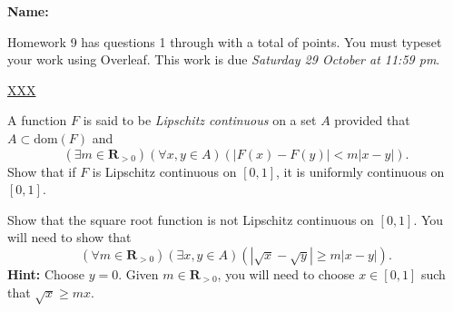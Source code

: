 \documentclass[12pt,fleqn]{exam}
\newcommand{\reals}{\mathbf{R}}
\newcommand{\dom}{\mbox{dom}}
\newcommand\PM{{\sc pm}}
\newcommand{\quiz}{9}
\newcommand{\term}{Fall}
\newcommand{\due}{Saturday 29 October  at 11:59 \PM}
\begin{document}
\large
\vspace{0.1in}
\noindent{}
{\bf Name:}  \\
\noindent \makebox[3.0truein][l]{\bf Homework   \quiz, \term \/ \the\year}
\vspace{0.1in}

\begin{quote}
    \end{quote}
\noindent  Homework    \quiz\/  has questions 1 through  \numquestions \/ with 
a total of  \numpoints\/  points.  You must typeset your work using Overleaf.
 This work is due \emph{\due}.

\vspace{0.1in}

\url{XXX}

\begin{questions} 

\question[5] A function $F$ is said to be \emph{Lipschitz continuous} on a set $A$ provided that $A \subset \dom(F)$ 
and
\begin{equation*}
    \left(\exists m \in \reals_{>0} \right) \left( \forall  x, y \in A \right) \left( |F(x) -F(y)| < m |x - y| \right).
\end{equation*}
Show that if $F$ is Lipschitz continuous on $[0,1]$, it is uniformly continuous on $[0,1]$.

\question[5] Show that the square root function is not Lipschitz continuous on $[0,1]$.  You will need to show that
\begin{equation*}
    \left(\forall m \in \reals_{>0} \right) \left( \exists x, y \in A \right) \left( |\sqrt{x} - \sqrt{y}| \geq m |x - y| \right).
\end{equation*}
\textbf{Hint:} Choose $y=0$.  Given $m \in \reals_{>0}$, you will need to choose $x \in [0,1]$ such that 
$  \sqrt{x} \geq m x$.

\end{questions}
\end{document}
